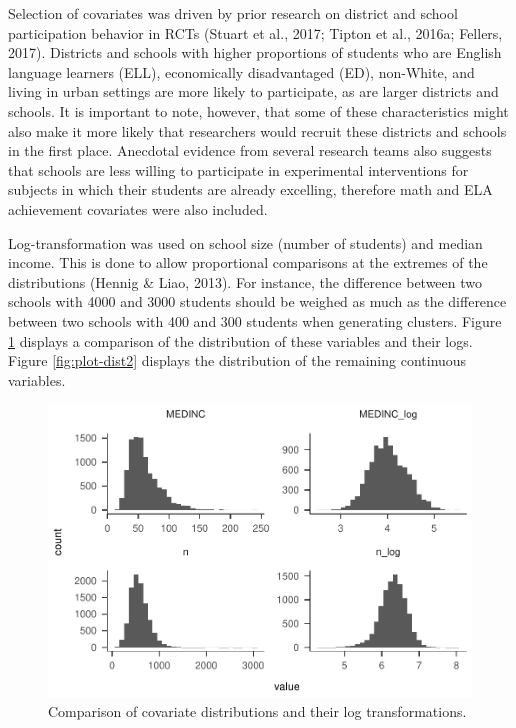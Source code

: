 \documentclass[man,floatsintext]{apa6}
\theoremstyle{definition}
\theoremstyle{definition}
\theoremstyle{definition}
\theoremstyle{remark}
\begin{document}
Selection of covariates was driven by prior research on district and
school participation behavior in RCTs (Stuart et al., 2017; Tipton et
al., 2016a; Fellers, 2017). Districts and schools with higher
proportions of students who are English language learners (ELL),
economically disadvantaged (ED), non-White, and living in urban settings
are more likely to participate, as are larger districts and schools. It
is important to note, however, that some of these characteristics might
also make it more likely that researchers would recruit these districts
and schools in the first place. Anecdotal evidence from several research
teams also suggests that schools are less willing to participate in
experimental interventions for subjects in which their students are
already excelling, therefore math and ELA achievement covariates were
also included.

Log-transformation was used on school size (number of students) and
median income. This is done to allow proportional comparisons at the
extremes of the distributions (Hennig \& Liao, 2013). For instance, the
difference between two schools with 4000 and 3000 students should be
weighed as much as the difference between two schools with 400 and 300
students when generating clusters. Figure \ref{fig:plot-dist1} displays
a comparison of the distribution of these variables and their logs.
Figure \ref{fig:plot-dist2} displays the distribution of the remaining
continuous variables.

\begin{figure}
\centering
\includegraphics{GenSamp_Paper_files/figure-latex/plot-dist1-1.pdf}
\caption{\label{fig:plot-dist1}Comparison of covariate distributions and
their log transformations.}
\end{figure}
\end{document}
